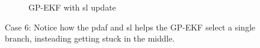 \begin{figure}
    \begin{subfigure}{\textwidth}
        \caption{GP-EKF with \acrshort{sl} update}
    \end{subfigure}
    \caption{Case 6: Notice how the \acrshort{pdaf} and \acrshort{sl} helps the GP-EKF select a single branch, insteading getting stuck in the middle.}
\end{figure}

